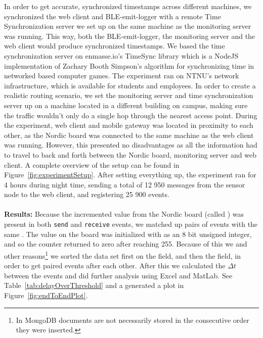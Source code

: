 In order to get accurate, synchronized timestamps across different machines, we synchronized the web client and BLE-emit-logger with a remote Time Synchronization server we set up on the same machine as the monitoring server was running. This way, both the BLE-emit-logger, the monitoring server and the web client would produce synchronized timestamps. We based the time synchronization server on enmasse.io's TimeSync library\cite{timesync} which is a NodeJS implementation of Zachary Booth Simpson's algorithm for synchronizing time in networked based computer games\cite{timesync:algo}. The experiment ran on NTNU's network infrastructure, which is available for students and employees. In order to create a realistic routing scenario, we set the monitoring server and time synchronization server up on a machine located in a different building on campus, making sure the traffic wouldn't only do a single hop through the nearest access point. During the experiment, web client and mobile gateway was located in proximity to each other, as the Nordic board was connected to the same machine as the web client was running. However, this presented no disadvantages as all the information had to travel to back and forth between the Nordic board, monitoring server and web client. A complete overview of the setup can be found in Figure~\ref{fig:experimentSetup}. After setting everything up, the experiment ran for 4 hours during night time, sending a total of 12 950 messages from the sensor node to the web client, and registering 25 900 events.
\\
\\
\noindent
\textbf{Results:} 
Because the incremented value from the Nordic board (called ) was present in both \texttt{send} and \texttt{receive} events, we matched up pairs of events with the same . The value on the board was initialized with as an 8 bit unsigned integer, and so the counter returned to zero after reaching 255. Because of this we and other reasons\footnote{In MongoDB documents are not necessarily stored in the consecutive order they were inserted.} we sorted the data set first on the  field, and then the  field, in order to get paired events after each other. After this we calculated the $\Delta t$ between the events and did further analysis using Excel and MatLab. See Table~\ref{tab:delayOverThreshold} and a generated a plot in Figure~\ref{fig:endToEndPlot}.

